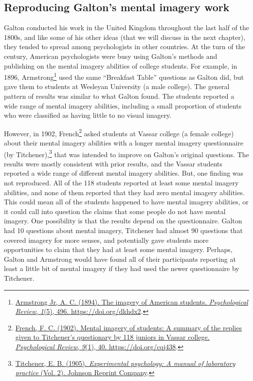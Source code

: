\documentclass[
  oneside,
  12pt]{crumpbook}
\begin{document}
\hypertarget{reproducing-galtons-mental-imagery-work}{%
\subsection{Reproducing Galton's mental imagery work}\label{reproducing-galtons-mental-imagery-work}}

Galton conducted his work in the United Kingdom throughout the last half of the 1800s, and like some of his other ideas (that we will discuss in the next chapter), they tended to spread among psychologists in other countries. At the turn of the century, American psychologists were busy using Galton's methods and publishing on the mental imagery abilities of college students. For example, in 1896, Armstrong\footnote{\protect\hyperlink{ref-armstrongjrImageryAmericanStudents1894}{Armstrong Jr, A. C. (1894). The imagery of {American} students. \emph{Psychological Review}, \emph{1}(5), 496. \url{https://doi.org/dkhdx2}}.} used the same ``Breakfast Table'' questions as Galton did, but gave them to students at Wesleyan University (a male college). The general pattern of results was similar to what Galton found. The students reported a wide range of mental imagery abilities, including a small proportion of students who were classified as having little to no visual imagery.

However, in 1902, French\footnote{\protect\hyperlink{ref-frenchMentalImageryStudents1902}{French, F. C. (1902). Mental imagery of students: {A} summary of the replies given to {Titchener}'s questionary by 118 juniors in {Vassar} college. \emph{Psychological Review}, \emph{9}(1), 40. \url{https://doi.org/cqj438}}.} asked students at Vassar college (a female college) about their mental imagery abilities with a longer mental imagery questionnaire (by Titchener),\footnote{\protect\hyperlink{ref-titchenerExperimentalPsychologyManual1905}{Titchener, E. B. (1905). \emph{Experimental psychology: {A} manual of laboratory practice} (Vol. 2). {Johnson Reprint Company}}.} that was intended to improve on Galton's original questions. The results were mostly consistent with prior results, and the Vassar students reported a wide range of different mental imagery abilities. But, one finding was not reproduced. All of the 118 students reported at least some mental imagery abilities, and none of them reported that they had zero mental imagery abilities. This could mean all of the students happened to have mental imagery abilities, or it could call into question the claims that some people do not have mental imagery. One possibility is that the results depend on the questionnaire. Galton had 10 questions about mental imagery, Titchener had almost 90 questions that covered imagery for more senses, and potentially gave students more opportunities to claim that they had at least some mental imagery. Perhaps, Galton and Armstrong would have found all of their participants reporting at least a little bit of mental imagery if they had used the newer questionnaire by Titchener.
\end{document}
